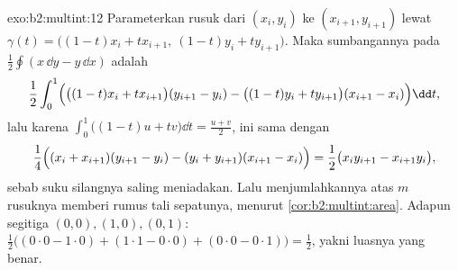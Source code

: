 \begin{solution}{exo:b2:multint:12}
Parameterkan rusuk dari $(x_i, y_i)$ ke $(x_{i+1}, y_{i+1})$
lewat $\gamma(t) = \bigl((1-t)x_i + tx_{i+1},\ (1-t)y_i +
ty_{i+1}\bigr)$. Maka sumbangannya pada
$\frac12\oint(x\,\dd y - y\,\dd x)$ adalah
\[
\frac12\int_0^1\Bigl(\bigl((1-t)x_i +
tx_{i+1}\bigr)(y_{i+1} - y_i) - \bigl((1-t)y_i +
ty_{i+1}\bigr)(x_{i+1} - x_i)\Bigr)\dd t ,
\]
lalu karena $\int_0^1\bigl((1-t)u + tv\bigr)\dd t = \frac{u +
v}2$, ini sama dengan
\[
\frac14\Bigl((x_i + x_{i+1})(y_{i+1} - y_i) - (y_i +
y_{i+1})(x_{i+1} - x_i)\Bigr)
= \frac12\bigl(x_iy_{i+1} - x_{i+1}y_i\bigr),
\]
sebab suku silangnya saling meniadakan. Lalu menjumlahkannya atas $m$ rusuknya memberi
rumus tali sepatunya, menurut \cref{cor:b2:multint:area}. Adapun segitiga
$(0,0), (1,0), (0,1)$: $\frac12\bigl((0\cdot0 - 1\cdot0) +
(1\cdot1 - 0\cdot0) + (0\cdot0 - 0\cdot1)\bigr) = \frac12$,
yakni luasnya yang benar.
\end{solution}

